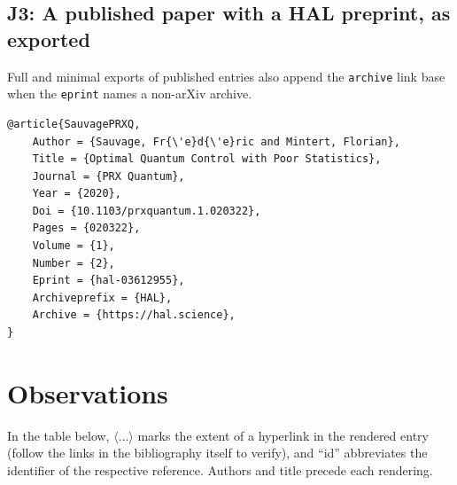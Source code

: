\documentclass[onecolumn, amsmath, amssymb, aps, pra]{revtex4-2}
\begin{document}
\subsection{J3: A published paper with a HAL preprint, as
exported~\cite{SauvagePRXQ}}

Full and minimal exports of published entries also append the
\texttt{archive} link base when the \texttt{eprint} names a non-arXiv
archive.

\begin{Verbatim}
@article{SauvagePRXQ,
    Author = {Sauvage, Fr{\'e}d{\'e}ric and Mintert, Florian},
    Title = {Optimal Quantum Control with Poor Statistics},
    Journal = {PRX Quantum},
    Year = {2020},
    Doi = {10.1103/prxquantum.1.020322},
    Pages = {020322},
    Volume = {1},
    Number = {2},
    Eprint = {hal-03612955},
    Archiveprefix = {HAL},
    Archive = {https://hal.science},
}
\end{Verbatim}

\section{Observations}

In the table below, $\langle\ldots\rangle$ marks the extent of a hyperlink
in the rendered entry (follow the links in the bibliography itself to
verify), and ``id'' abbreviates the identifier of the respective
reference. Authors and title precede each rendering.
\end{document}

